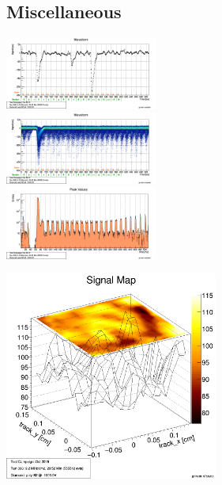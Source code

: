 \documentclass[9pt]{beamer}
\begin{document}
\subsection{Miscellaneous}
\begin{frame}
	\begin{center}
		\includegraphics[width=5cm]{SingleWF}\\
		\includegraphics[width=5cm]{WaveForms5000}\\
		\includegraphics[width=5cm]{Pics/PeakValues}
	\end{center}
\end{frame}
\begin{frame}
	\begin{center}
		\includegraphics[width=7.0cm]{Pics/2DMap}
	\end{center}
\end{frame}

\end{document}
